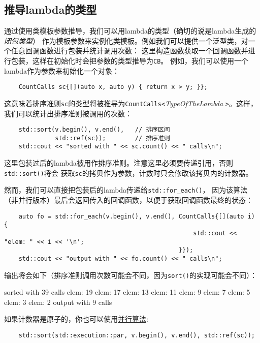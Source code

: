 \subsection{推导lambda的类型}
通过使用类模板参数推导，我们可以用lambda的类型（确切的说是lambda生成的\emph{闭包类型}）
作为模板参数来实例化类模板。例如我们可以提供一个泛型类，对一个任意回调函数进行包装并统计调用次数：
这里构造函数获取一个回调函数并进行包装，这样在初始化时会把参数的类型推导为\texttt{CB}。
例如，我们可以使用一个lambda作为参数来初始化一个对象：
\begin{lstlisting}
    CountCalls sc{[](auto x, auto y) { return x > y; }};
\end{lstlisting}
这意味着排序准则\texttt{sc}的类型将被推导为\texttt{CountCalls<}\emph{TypeOfTheLambda}
\texttt{>}。这样，我们可以统计出排序准则被调用的次数：
\begin{lstlisting}
    std::sort(v.begin(), v.end(),   // 排序区间
              std::ref(sc));        // 排序准则
    std::cout << "sorted with " << sc.count() << " calls\n";
\end{lstlisting}
这里包装过后的lambda被用作排序准则。注意这里必须要传递引用，否则\texttt{std::sort()}将会
获取\texttt{sc}的拷贝作为参数，计数时只会修改该拷贝内的计数器。

然而，我们可以直接把包装后的lambda传递给\texttt{std::for\_each()}，
因为该算法（非并行版本）最后会返回传入的回调函数，以便于获取回调函数最终的状态：
\begin{lstlisting}
    auto fo = std::for_each(v.begin(), v.end(), CountCalls{[](auto i) {
                                                    std::cout << "elem: " << i << '\n';
                                                }});
    std::cout << "output with " << fo.count() << " calls\n";
\end{lstlisting}
输出将会如下（排序准则调用次数可能会不同，因为\texttt{sort()}的实现可能会不同）：
\begin{blacklisting}
    sorted with 39 calls
    elem: 19
    elem: 17
    elem: 13
    elem: 11
    elem: 9
    elem: 7
    elem: 5
    elem: 3
    elem: 2
    output with 9 calls
\end{blacklisting}
如果计数器是原子的，你也可以使用\hyperref[ch22]{并行算法}:
\begin{lstlisting}
    std::sort(std::execution::par, v.begin(), v.end(), std::ref(sc));
\end{lstlisting}

